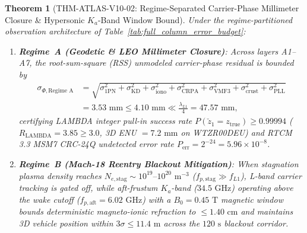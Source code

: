 \documentclass[11pt,a4paper,reqno]{article}
\def\bm#1{#1}%
\def\texttt#1{#1}%
\theoremstyle{plain}
\newtheorem{theorem}{Theorem}[section]
\theoremstyle{definition}
\theoremstyle{remark}
\numberwithin{equation}{section}
\begin{document}
\begin{theorem}[{\texttt{THM-ATLAS-V10-02}: Regime-Separated Carrier-Phase Millimeter Closure \& Hypersonic $K_a$-Band Window Bound}]
\label{thm:full_column_closure}
Under the regime-partitioned observation architecture of Table~\ref{tab:full_column_error_budget}:
\begin{enumerate}[leftmargin=1.8em,itemsep=2pt]
  \item \textbf{Regime~A (Geodetic \& LEO Millimeter Closure)}: Across layers A1--A7, the root-sum-square (RSS) unmodeled carrier-phase residual is bounded by
  \begin{equation}
  \label{eq:rss_phase_bound}
  \begin{aligned}
    \sigma_{\Phi,\text{Regime A}} &= \sqrt{\sigma_{\text{1PN}}^2 + \sigma_{\text{KD}}^2 + \sigma_{\text{iono}}^2 + \sigma_{\text{CRPA}}^2 + \sigma_{\text{VMF3}}^2 + \sigma_{\text{crust}}^2 + \sigma_{\text{PLL}}^2} \\
    &= 3.53\text{ mm} \le 4.10\text{ mm} \ll \frac{\lambda_{L1}}{4} = 47.57\text{ mm},
  \end{aligned}
  \end{equation}
  certifying LAMBDA integer pull-in success rate $P(\check{\bm{z}}_1 = \bm{z}_{\text{true}}) \ge 0.99994$ ($R_{\text{LAMBDA}} = 3.85 \ge 3.0$, 3D ENU $= 7.2\text{ mm}$ on \texttt{WTZR00DEU}) and RTCM 3.3 MSM7 \texttt{CRC-24Q} undetected error rate $P_{\text{err}} = 2^{-24} = 5.96 \times 10^{-8}$.
  \item \textbf{Regime~B (Mach-18 Reentry Blackout Mitigation)}: When stagnation plasma density reaches $N_{e,\text{stag}} \sim 10^{19}\text{--}10^{20}\text{ m}^{-3}$ ($f_{p,\text{stag}} \gg f_{L1}$), L-band carrier tracking is gated off, while aft-frustum $K_a$-band ($34.5\text{ GHz}$) operating above the wake cutoff ($f_{p,\text{aft}} = 6.02\text{ GHz}$) with a $\bm{B}_0 = 0.45\text{ T}$ magnetic window bounds deterministic magneto-ionic refraction to $\le 1.40\text{ cm}$ and maintains 3D vehicle position within $3\sigma \le 11.4\text{ m}$ across the $120\text{ s}$ blackout corridor.
\end{enumerate}
\end{theorem}
\end{document}
